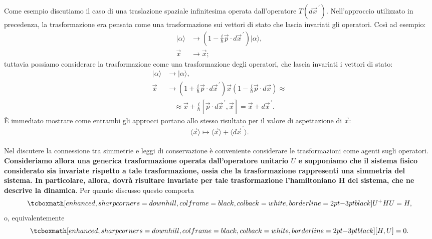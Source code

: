 Come esempio discutiamo il caso di una traslazione spaziale infinitesima operata dall'operatore $T(d\vec{x}^{\,\prime})$.
Nell'approccio utilizzato in precedenza, la trasformazione era pensata come una trasformazione sui vettori di stato che lascia invariati gli operatori. Così ad esempio:
	\begin{align}
		  |\alpha \rangle &\rightarrow (1- \frac{i}{\hbar}\vec{p}\cdot d\vec{x}^{\, \prime}) |\alpha \rangle ,  \\
		  \vec{x}&\rightarrow \vec{x};  
	\end{align}
tuttavia possiamo considerare la trasformazione come una trasformazione degli operatori, che lascia invariati i vettori di stato:
	\begin{align}
			|\alpha \rangle &\rightarrow  |\alpha \rangle , \\
			\vec{x} &\rightarrow \left(1+ \frac{i}{\hbar} \vec{p}\cdot d\vec{x}^{\, \prime}\right) \vec{x} \left(1-\frac{i}{\hbar} \vec{p} \cdot d\vec{x}\right) \approx  \nonumber\\
			& \quad \approx\vec{x}+ \frac{i}{\hbar}[\vec{p}\cdot d\vec{x}^{\, \prime},\vec{x}]=  \vec{x}+ d\vec{x}^{\, \prime} .
	\end{align}
È immediato mostrare come entrambi gli approcci portano allo stesso risultato per il valore di aspettazione di $\vec{x}$:
	\begin{equation}
		\langle \vec{x} \rangle  \mapsto \langle \vec{x}\rangle + \langle d\vec{x}^{\, \prime} \rangle.
	\end{equation}\\

Nel discutere la connessione tra simmetrie e leggi di conservazione è conveniente considerare le trasformazioni come agenti sugli operatori. \textbf{Consideriamo allora una generica trasformazione operata dall'operatore unitario ${U}$ e supponiamo che il sistema fisico considerato sia invariate rispetto a tale trasformazione, ossia che la trasformazione rappresenti una simmetria del sistema. In particolare, allora, dovrà risultare invariate per tale trasformazione l'hamiltoniano H del sistema, che ne descrive la dinamica}. Per quanto discusso questo comporta
	\begin{equation}
		\tcboxmath[enhanced, sharp corners=downhill, colframe=black, colback=white, borderline={2pt}{-3pt}{black}]{
			{U}^+H{U}= H,
			}
	\end{equation}
o, equivalentemente 
	\begin{equation}
	\label{eq:cap12_5}
		\tcboxmath[enhanced, sharp corners=downhill, colframe=black, colback=white, borderline={2pt}{-3pt}{black}]{
			[H,{U}]=0.
			}
	\end{equation}\\

